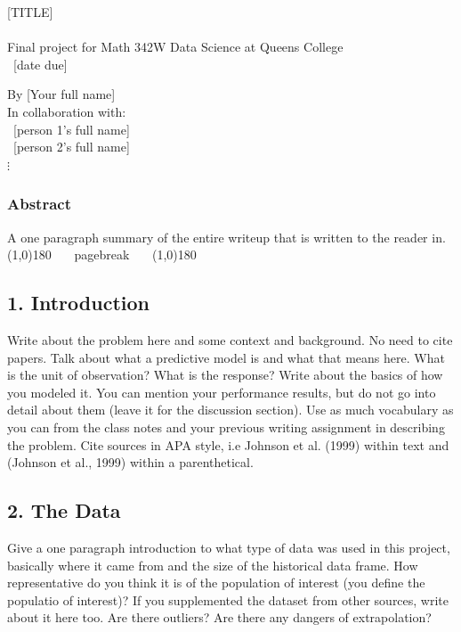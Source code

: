 \documentclass[12pt]{article}
\begin{document}
\begin{tcolorbox}

\begin{center}
\LARGE{[TITLE]}\\~\\
\footnotesize Final project for Math 342W Data Science at Queens College\\
~[date due]~
\end{center}

\begin{flushright}
By [Your full name]\\
In collaboration with:\\
~[person 1's full name]~\\
~[person 2's full name]~\\
$\vdots$~~~\\
\end{flushright}

\subsubsection*{Abstract}

A one paragraph summary of the entire writeup that is written to  the reader in.\\

\line(1,0){180} ~~~pagebreak~~~ \line(1,0){180}


\subsection*{1. Introduction}

Write about the problem here and some context and background. No need to cite papers. Talk about what a predictive model is and what that means here. What is the unit of observation? What is the response? Write about the basics of how you modeled it. You can mention your performance results, but do not go into detail about them (leave it for the discussion section). Use as much vocabulary as you can from the class notes and your previous writing assignment in describing the problem. Cite sources in APA style, i.e Johnson et al. (1999) within text and (Johnson et al., 1999) within a parenthetical.


\subsection*{2. The Data}

Give a one paragraph introduction to what type of data was used in this project, basically where it came from and the size of the historical data frame. How representative do you think it is of the population of interest (you define the populatio of interest)? If you supplemented the dataset from other sources, write about it here too. Are there outliers? Are there any dangers of extrapolation?



\end{tcolorbox}
\end{document}

